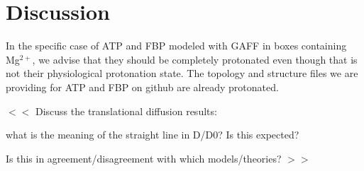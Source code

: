 \documentclass[journal=jacsat,manuscript=article]{achemso}
\begin{document}
 
 
 
 
 
 
 
 
 
 
 
 
 
\section*{Discussion}\label{sec:dissc}


 In the specific case of ATP and FBP modeled with GAFF in boxes containing Mg$^{2+}$, we advise that they should be completely protonated even though that is not their physiological protonation state. The topology and structure files we are providing for ATP and FBP on github are already protonated.


\colorbox{blue!50}{ $<<$ Discuss the translational diffusion results: } 

\colorbox{blue!50}{what is the meaning of the straight line in D/D0? Is this expected? }

\colorbox{blue!50}{Is this in agreement/disagreement with which models/theories? $>>$ }



 
 
\end{document}
